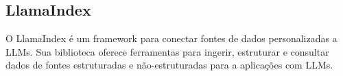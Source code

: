 \documentclass[
	12pt,				%
	openright,			%
	oneside,			    %
	a4paper,				%
	english,			%
	french,			%
	spanish,			%
	brazil			%
	]{abntex2}
\begin{document}
    \subsection{LlamaIndex}
    O LlamaIndex é um framework para conectar fontes de dados personalizadas a LLMs. Sua biblioteca oferece ferramentas para ingerir, estruturar e consultar dados de fontes estruturadas e não-estruturadas para a aplicações com LLMs.
    
\postextual



\end{document}
